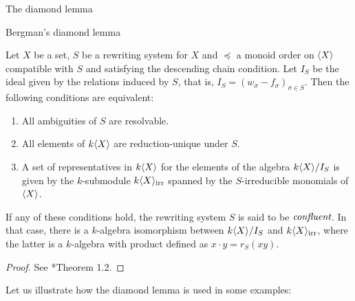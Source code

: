 \begin{chapter}{The diamond lemma}
\begin{section}{Bergman's diamond lemma}
\begin{thm} Let $X$ be a set, $S$ be a rewriting system for $X$ and $\preceq$ a monoid order on $\langle X\rangle$ compatible with $S$ and satisfying the descending chain condition. Let $I_S$ be the ideal given by the relations induced by $S$, that is, $I_S=(w_\sigma-f_\sigma)_{\sigma\in S}$. Then the following conditions are equivalent:
\begin{enumerate}
\item All ambiguities of $S$ are resolvable.
\item All elements of $k\langle X\rangle$ are reduction-unique under $S$.
\item A set of representatives in $k\langle X\rangle$ for the elements of the algebra $k\langle X\rangle/I_S$ is given by the $k$-submodule $k\langle X\rangle_{\mathrm{irr}}$ spanned by the $S$-irreducible monomials of $\langle X\rangle$.
\end{enumerate}
If any of these conditions hold, the rewriting system $S$ is said to be $\emph{confluent}$. In that case, there is a $k$-algebra isomorphism between $k\langle X\rangle/I_S$ and $k\langle X\rangle_{\mathrm{irr}}$, where the latter is a $k$-algebra with product defined as $x\cdot y= r_S(xy)$.
\end{thm}
\begin{proof} See {\cite{Ber78}*{Theorem 1.2}}.
\end{proof}

Let us illustrate how the diamond lemma is used in some examples:


\end{section}
\end{chapter}
